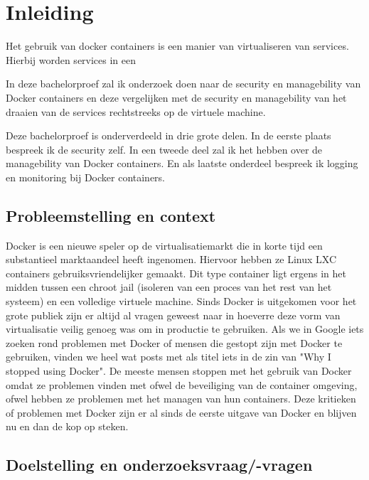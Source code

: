 \chapter{Inleiding}
\label{ch:inleiding}

Het gebruik van docker containers is een manier van virtualiseren van services. Hierbij worden services in een 

In deze bachelorproef zal ik onderzoek doen naar de security en managebility van Docker containers en deze vergelijken met de security en managebility van het draaien van de services rechtstreeks op de virtuele machine.

Deze bachelorproef is onderverdeeld in drie grote delen. In de eerste plaats bespreek ik de security zelf. In een tweede deel zal ik het hebben over de managebility van Docker containers. En als laatste onderdeel bespreek ik logging en monitoring bij Docker containers.

\section{Probleemstelling en context}
\label{sec:onderzoeksvragen}


Docker is een nieuwe speler op de virtualisatiemarkt die in korte tijd een substantieel marktaandeel heeft ingenomen. Hiervoor hebben ze Linux LXC containers gebruiksvriendelijker gemaakt. Dit type container ligt ergens in het midden tussen een chroot jail (isoleren van een proces van het rest van het systeem) en een volledige virtuele machine. Sinds Docker is uitgekomen voor het grote publiek zijn er altijd al vragen geweest naar in hoeverre deze vorm van virtualisatie veilig genoeg was om in productie te gebruiken. Als we in Google iets zoeken rond problemen met Docker of mensen die gestopt zijn met Docker te gebruiken, vinden we heel wat posts met als titel iets in de zin van "Why I stopped using Docker". De meeste mensen stoppen met het gebruik van Docker omdat ze problemen vinden met ofwel de beveiliging van de container omgeving, ofwel hebben ze problemen met het managen van hun containers. Deze kritieken of problemen met Docker zijn er al sinds de eerste uitgave van Docker en blijven nu en dan de kop op steken.  

\section{Doelstelling en onderzoeksvraag/-vragen}

